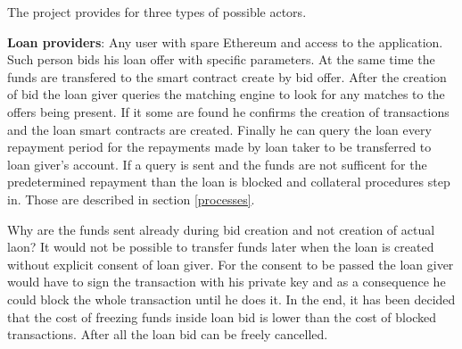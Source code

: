 \documentclass[a4paper,12pt,twoside,openany]{report}
\begin{document}
The project provides for three types of possible actors. 

\textbf{Loan providers}: Any user with spare Ethereum and access to the application. Such person bids his loan offer with specific parameters. At the same time the funds are transfered to the smart contract create by bid offer. After the creation of bid the loan giver queries the matching engine to look for any matches to the offers being present. If it some are found he confirms the creation of transactions and the loan smart contracts are created. Finally he can query the loan every repayment period for the repayments made by loan taker to be transferred to loan giver's account. If a query is sent and the funds are not sufficent for the predetermined repayment than the loan is blocked and collateral procedures step in. Those are described in section \ref{processes}.

Why are the funds sent already during bid creation and not creation of actual laon? It would not be possible to transfer funds later when the loan is created without explicit consent of loan giver. For the consent to be passed the loan giver would have to sign the transaction with his private key and as a consequence he could block the whole transaction until he does it. In the end, it has been decided that the cost of freezing funds inside loan bid is lower than the cost of blocked transactions. After all the loan bid can be freely cancelled.
\end{document}
